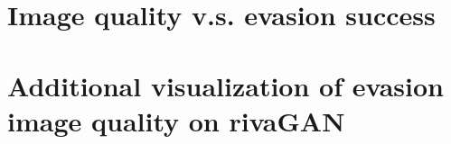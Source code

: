 \section{Image quality v.s. evasion success} 
\label{App: psnr-ba}


% 

\section{Additional visualization of evasion image quality on rivaGAN}
\label{Sec App: rivaGan evasion patterns}
